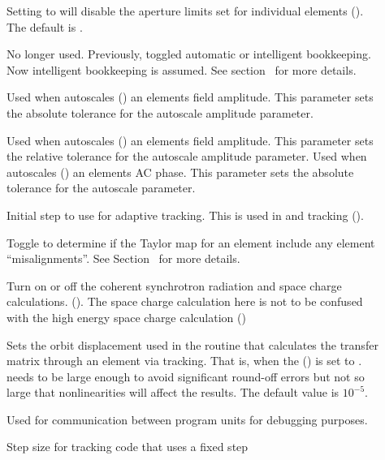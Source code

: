 {\begin{description}
%
\item[] \Newline
Setting  to  will disable the aperture limits set for individual
elements (). The default is .
%
\item[] \Newline
No longer used. Previously, toggled automatic or intelligent bookkeeping. Now intelligent bookkeeping is assumed. See
section~ for more details.
%
\item[] \Newline
Used when \bmad autoscales () an elements field amplitude. This parameter sets the
absolute tolerance for the autoscale amplitude parameter.
%
\item[] \Newline
Used when \bmad autoscales () an elements field amplitude. This parameter sets the
relative tolerance for the autoscale amplitude parameter.
%
Used when \bmad autoscales () an elements AC phase. This parameter sets the
absolute tolerance for the autoscale parameter.
%
\item[] \Newline
\item[] \Newline
Initial step to use for adaptive tracking. This is used in
 and  tracking ().
%
\item[] \Newline
Toggle to determine if the Taylor map for an element include any
element ``misalignments''.  See Section~ for more
details.
%
\item[] \Newline
Turn on or off the coherent synchrotron radiation and space charge calculations. ().
The space charge calculation here is not to be confused with the high energy space charge
calculation ()
%
\item[] \Newline 
Sets the orbit displacement used in the routine that calculates the transfer matrix through an
element via tracking. That is, when the  () is set to
.  needs to be large enough to avoid significant round-off errors but not so
large that nonlinearities will affect the results. The default value is $10^{-5}$.
%
\item[] \Newline
Used for communication between program units for debugging purposes.
%
\item[] \Newline
Step size for tracking code  that uses a fixed step

\end{description}}
